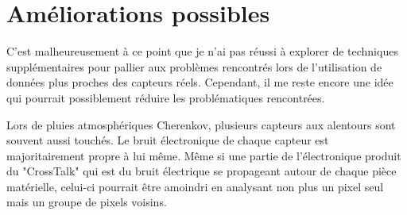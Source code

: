 \section{Améliorations possibles}
C'est malheureusement à ce point que je n'ai pas réussi à explorer de techniques supplémentaires pour pallier aux problèmes 
rencontrés lors de l'utilisation de données plus proches des capteurs réels. Cependant, il me reste encore une idée qui 
pourrait possiblement réduire les problématiques rencontrées.

Lors de pluies atmosphériques Cherenkov, plusieurs capteurs aux alentours sont souvent aussi touchés.
Le bruit électronique de chaque capteur est majoritairement propre à lui même. Même si une partie de 
l'électronique produit du "CrossTalk" qui est du bruit électrique se propageant autour de chaque pièce matérielle, 
celui-ci pourrait être amoindri en analysant non plus un pixel seul mais un groupe de pixels voisins.